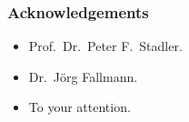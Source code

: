 \begin{frame}[t]
    \frametitle{Acknowledgements}
    \begin{itemize}
        \item Prof.\ Dr.\ Peter F.\ Stadler.
        \item Dr.\ Jörg Fallmann.
        \item To your attention.
    \end{itemize}
\end{frame}
